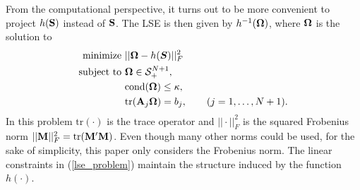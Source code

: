 \documentclass[11pt]{article}
\newcommand{\UNIT}{\text{UNIT}}
\newcommand{\SD}{\text{SD}}
\newcommand{\R}{\mathbb{R}}
\theoremstyle{definition}
\theoremstyle{definition}
\def\bSigma{{\bf \Sigma}}
\def\bOmega{{\bf \Omega}}
\def\A{{\bf A}}
\def\M{{\bf M}}
\def\SS{{\bf S}}
\def\cond{\text{cond}}
\def\Tr{\text{tr}}
\begin{document}
From the computational perspective, it turns out to be more convenient to project $h(\SS)$ instead of $\SS$.  The LSE is then given by $h^{-1}(\bOmega)$, where $\bOmega$ is the solution to
\begin{align}
 \label{lse_problem}
 \begin{split}
\text{minimize } &  || \bOmega - h(\boldsymbol{S}) ||_F^2\\
\text{subject to } & \bOmega \in \mathcal{S}_{+}^{N+1},\\
& \cond(\bOmega) \leq \kappa,\\
& \Tr(\A_j \bOmega) = b_j, \hspace{2em} (j = 1, \dots, N+1).
\end{split}
\end{align}
In this problem $\Tr(\cdot)$ is the trace operator and $||\cdot||_F^2$ is the squared Frobenius norm $||\M||_F^2 = \Tr(\M'\M)$. Even though many other norms could be used, for the sake of simplicity, this paper only considers the Frobenius norm. 
The linear constraints in (\ref{lse_problem}) maintain the structure induced by the function $h(\cdot)$. 
\end{document}

